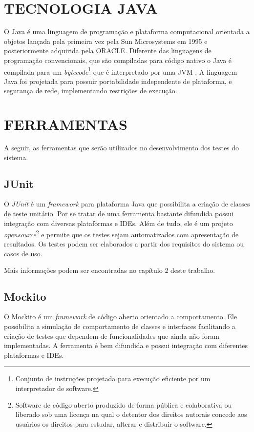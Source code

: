 \section{TECNOLOGIA JAVA}

O Java é uma linguagem de programação e plataforma computacional orientada a objetos lançada pela primeira vez pela Sun Microsystems em 1995 e posteriormente adquirida pela ORACLE. Diferente das linguagens de programação convencionais, que são compiladas para código nativo o Java é compilada para um \textit{bytecode}\footnote{Conjunto de instruções projetada para execução eficiente por um interpretador de software. } que é interpretado por uma JVM \cite{Java}. A linguagem Java foi projetada para possuir portabilidade independente de plataforma, e segurança de rede, implementando restrições de execução.

\section{FERRAMENTAS}

A seguir, as ferramentas que serão utilizados no desenvolvimento dos
testes do sistema.

\subsection{JUnit}

O  \textit{JUnit} é um \textit{framework} para plataforma Java que possibilita a criação de classes de teste unitário. Por se tratar de uma ferramenta bastante difundida possui integração com diversas plataformas e IDEs. Além de tudo, ele é um projeto \textit{opensource}\footnote{Software de código aberto produzido de forma pública e colaborativa ou liberado sob uma licença na qual o detentor dos direitos autorais concede aos usuários os direitos para estudar, alterar e distribuir o software.} e permite que os testes sejam automatizados com apresentação de resultados. Os testes podem ser elaborados a partir dos requisitos do sistema ou casos de uso. 


Mais informações podem ser encontradas no capítulo 2 deste trabalho.

\subsection{Mockito}

O Mockito é um \textit{framework} de código aberto orientado a comportamento. Ele possibilita a simulação de comportamento de classes e interfaces facilitando a criação de testes que dependem de funcionalidades que ainda não foram implementadas. A ferramenta é bem difundida e possui integração com diferentes plataformas e IDEs. 

